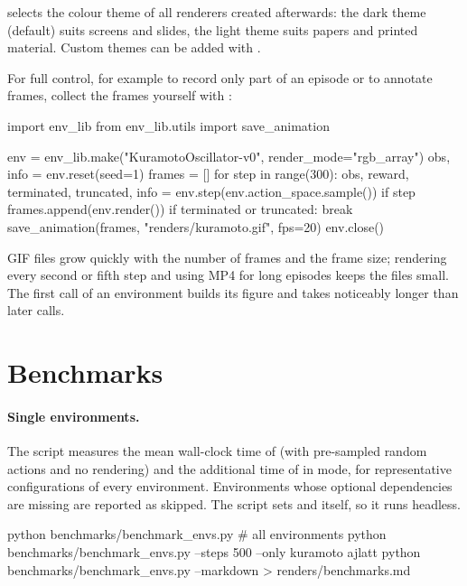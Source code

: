  selects the colour theme of all renderers
created afterwards: the dark theme (default) suits screens and slides, the
light theme suits papers and printed material. Custom themes can be added with
.

For full control, for example to record only part of an episode or to
annotate frames, collect the frames yourself with :

\begin{pycode}
import env_lib
from env_lib.utils import save_animation

env = env_lib.make("KuramotoOscillator-v0", render_mode="rgb_array")
obs, info = env.reset(seed=1)
frames = []
for step in range(300):
    obs, reward, terminated, truncated, info = env.step(env.action_space.sample())
    if step %
        frames.append(env.render())
    if terminated or truncated:
        break
save_animation(frames, "renders/kuramoto.gif", fps=20)
env.close()
\end{pycode}

GIF files grow quickly with the number of frames and the frame size;
rendering every second or fifth step and using MP4 for long episodes keeps the
files small. The first  call of an environment builds its
figure and takes noticeably longer than later calls.

\section{Benchmarks}\label{sec:examples-benchmarks}

\paragraph{Single environments.} The script  measures the mean wall-clock
time of  (with pre-sampled random actions and no rendering)
and the additional time of  in  mode,
for representative configurations of every environment. Environments whose
optional dependencies are missing are reported as skipped. The script sets
 and  itself, so it runs
headless.

\begin{shellcode}
python benchmarks/benchmark_envs.py                        # all environments
python benchmarks/benchmark_envs.py --steps 500 --only kuramoto ajlatt
python benchmarks/benchmark_envs.py --markdown > renders/benchmarks.md
\end{shellcode}

